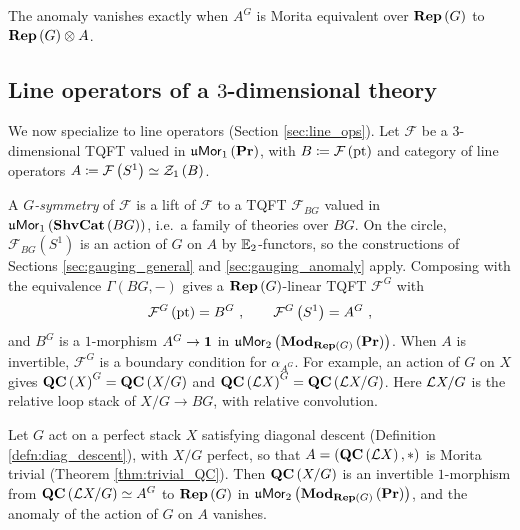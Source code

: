 The anomaly vanishes exactly when $A^G$ is Morita equivalent over $\mathbf{Rep}\left(G\right)$ to
$\mathbf{Rep}\left(G\right)\otimes A$.

\subsection{Line operators of a \texorpdfstring{$3$}{3}-dimensional theory}
\label{sec:gauging_lines}

We now specialize to line operators (Section \ref{sec:line_ops}).
Let $\mathcal{F}$ be a $3$-dimensional TQFT valued in $\mathfrak{u}\mathsf{Mor}_1\left(\mathbf{Pr}\right)$, with $B\coloneqq \mathcal{F}\left(\text{pt}\right)$
and category of line operators $A\coloneqq \mathcal{F}\left(S^1\right)\simeq \mathcal{Z}_1\left(B\right)$.

A \emph{$G$-symmetry} of $\mathcal{F}$ is a lift of $\mathcal{F}$ to a TQFT $\mathcal{F}_{BG}$ valued in
$\mathfrak{u}\mathsf{Mor}_1\left(\mathbf{ShvCat}\left(BG\right)\right)$, i.e.\ a family of theories over $BG$.
On the circle, $\mathcal{F}_{BG}\left(S^1\right)$ is an action of $G$ on $A$ by $\mathbb{E}_2$-functors,
so the constructions of Sections \ref{sec:gauging_general} and \ref{sec:gauging_anomaly}
apply.
Composing with the equivalence $\Gamma\left(BG,-\right)$ gives a $\mathbf{Rep}\left(G\right)$-linear
TQFT $\mathcal{F}^G$ with
\begin{equation*}
\mathcal{F}^G\left(\pt\right) = B^G \ ,
\qquad
\mathcal{F}^G\left(S^1\right) = A^G \ ,
\end{equation*}
and $B^G$ is a $1$-morphism $A^G\to\mathbf{1}$ in $\mathfrak{u}\mathsf{Mor}_2\left(\mathbf{Mod}_{\mathbf{Rep}\left(G\right)}\left(\mathbf{Pr}\right)\right)$.
When $A$ is invertible, $\mathcal{F}^G$ is a boundary condition for $\alpha_{A^G}$.
For example, an action of $G$ on $X$ gives $\mathbf{QC}\left(X\right)^G = \mathbf{QC}\left(X/G\right)$
and $\mathbf{QC}\left(\mathcal{L} X\right)^G = \mathbf{QC}\left(\mathcal{L} X/G\right)$.
Here $\mathcal{L} X/G$ is the relative loop stack of $X/G\to BG$, with relative convolution.

\begin{lem}
\label{lem:geometric}
Let $G$ act on a perfect stack $X$ satisfying diagonal descent (Definition
\ref{defn:diag_descent}), with $X/G$ perfect, so
that $A=\left(\mathbf{QC}\left(\mathcal{L} X\right),*\right)$ is Morita trivial (Theorem \ref{thm:trivial_QC}). Then
$\mathbf{QC}\left(X/G\right)$ is an invertible $1$-morphism from
$\mathbf{QC}\left(\mathcal{L} X/G\right)\simeq A^G$ to $\mathbf{Rep}\left(G\right)$ in $\mathfrak{u}\mathsf{Mor}_2\left(\mathbf{Mod}_{\mathbf{Rep}\left(G\right)}\left(\mathbf{Pr}\right)\right)$,
and the anomaly of the action of $G$ on $A$ vanishes.
\end{lem}

